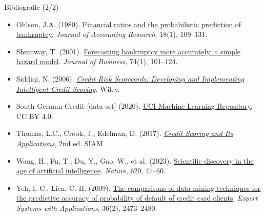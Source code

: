 \begin{frame}{Bibliografie (2/2)}
\begin{itemize}
    \item Ohlson, J.A. (1980). \href{https://doi.org/10.2307/2490395}{Financial ratios and the probabilistic prediction of bankruptcy}. \textit{Journal of Accounting Research}, 18(1), 109--131.
    \item Shumway, T. (2001). \href{https://doi.org/10.1086/209665}{Forecasting bankruptcy more accurately: a simple hazard model}. \textit{Journal of Business}, 74(1), 101--124.
    \item Siddiqi, N. (2006). \href{https://doi.org/10.1002/9781119201731}{\textit{Credit Risk Scorecards: Developing and Implementing Intelligent Credit Scoring}}. Wiley.
    \item South German Credit [data set] (2020). \href{https://doi.org/10.24432/C5QG88}{UCI Machine Learning Repository}, CC BY 4.0.
    \item Thomas, L.C., Crook, J., Edelman, D. (2017). \href{https://doi.org/10.1137/1.9781611974560}{\textit{Credit Scoring and Its Applications}}, 2nd ed. SIAM.
    \item Wang, H., Fu, T., Du, Y., Gao, W., et al. (2023). \href{https://doi.org/10.1038/s41586-023-06221-2}{Scientific discovery in the age of artificial intelligence}. \textit{Nature}, 620, 47--60.
    \item Yeh, I.-C., Lien, C.-H. (2009). \href{https://doi.org/10.1016/j.eswa.2007.12.020}{The comparisons of data mining techniques for the predictive accuracy of probability of default of credit card clients}. \textit{Expert Systems with Applications}, 36(2), 2473--2480.
\end{itemize}
\end{frame}


